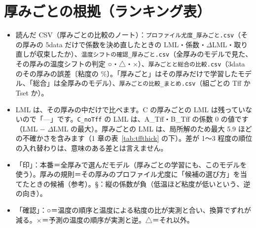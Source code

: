 \documentclass[paper=a4paper,landscape,fontsize=10pt,line_length=62zw,number_of_lines=34]{jlreq}
\begin{document}
\clearpage
\section{厚みごとの根拠（ランキング表）}\label{sec:thick}
\begin{itemize}[itemsep=0.2ex,topsep=0.3ex]
\item 読んだ CSV（厚みごとの比較のノート）：\texttt{プロファイル尤度\_\allowbreak{}厚みごと.csv}（その厚みの 5data だけで係数を決め直したときの LML・係数・$\Delta$LML・取り直しが収束したか）、\texttt{温度シフトの確認\_\allowbreak{}厚みごと.csv}（全厚みのモデルで見た、その厚みの温度シフトの判定 ○・△・×）、\texttt{厚みごとと総合の比較.csv}（3data のその厚みの誤差〔粘度の \%〕。「厚みごと」はその厚みだけで学習したモデル、「総合」は全厚みのモデル）、\texttt{厚みごとの比較\_\allowbreak{}まとめ.csv}（組ごとの Tff か Tset か）。
\item LML は、その厚みの中だけで比べます。C の厚みごとの LML は残っていないので「---」です。\texttt{C\_\allowbreak{}noTff} の LML は、A\_Tff・B\_Tff の係数 0 の値です（LML $-$ $\Delta$LML の最大）。厚みごとの LML は、局所解のため最大 5.9 ほどの不確かさを含みます（1 章の表~\ref{tab:tffthick} の下）。差が 1〜3 程度の順位の入れ替わりは、意味のある差とは言えません。
\item 「印」：本番＝全厚みで選んだモデル（厚みごとの学習にも、このモデルを使う）。厚みの規則＝その厚みのプロファイル尤度に「候補の選び方」を当てたときの候補（参考）。§：縦の係数が負（低温ほど粘度が低いという、逆の向き）。
\item 「確認」：○＝温度の順序と温度による粘度の比が実測と合い、換算でずれが減る。×＝予測の温度の順序が実測と逆。△＝それ以外。
\end{itemize}
\end{document}
